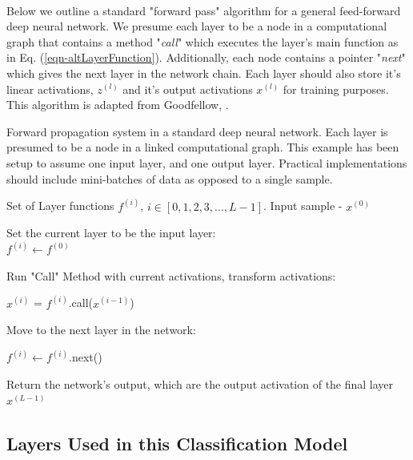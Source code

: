\documentclass[12pt,letterpaper]{article}
\begin{document}
\paragraph*{}Below we outline a standard "forward pass" algorithm for a general feed-forward deep neural network. We presume each layer to be a node in a computational graph that contains a method "\textit{call}" which executes the layer's main function as in Eq. (\ref{eqn-altLayerFunction}). Additionally, each node contains a pointer "\textit{next}" which gives the next layer in the network chain. Each layer should also store it's linear activations, $z^{(l)}$ and it's output activations $x^{(l)}$ for training purposes. This algorithm is adapted from Goodfellow, \cite{Goodfellow}.

\begin{algorithm}[H]
\caption{Forward propagation system in a standard deep neural network. Each layer is presumed to be a node in a linked computational graph. This example has been setup to assume one input layer, and one output layer. Practical implementations should include mini-batches of data as opposed to a single sample.}
\label{alg-FeedForward}

\begin{algorithmic}
\REQUIRE Set of Layer functions $f^{(i)}$, $i \in [0,1,2,3,...,L-1]$.
\REQUIRE Input sample - $x^{(0)}$

Set the current layer to be the input layer: \\
$f^{(i)} \leftarrow f^{(0)}$
	\item Run "Call" Method with current activations, transform activations:
	\item $x^{(i)}$ = $f^{(i)}$.call($x^{(i-1)}$)
	\item Move to the next layer in the network:
	\item $f^{(i)} \leftarrow f^{(i)}$.next()
\ENDFOR
\item Return the network's output, which are the output activation of the final layer \\
\RETURN $x^{(L-1)}$
\end{algorithmic}
\end{algorithm}


\subsection{Layers Used in this Classification Model}
\label{subsec-Layers}
\end{document}
